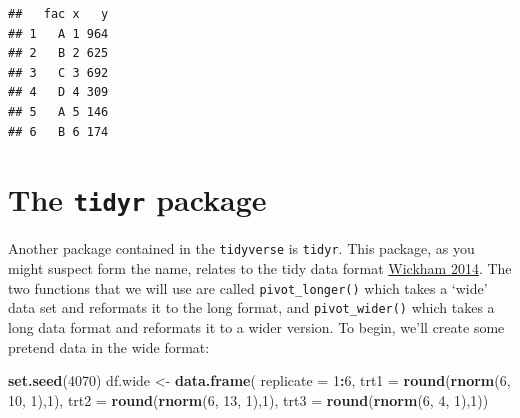 \documentclass[letterpaper,]{book}
\newenvironment{Shaded}{\begin{snugshade}}{\end{snugshade}}
\newcommand{\CommentTok}[1]{\textcolor[rgb]{0.56,0.35,0.01}{\textit{#1}}}
\newcommand{\DataTypeTok}[1]{\textcolor[rgb]{0.13,0.29,0.53}{#1}}
\newcommand{\DecValTok}[1]{\textcolor[rgb]{0.00,0.00,0.81}{#1}}
\newcommand{\KeywordTok}[1]{\textcolor[rgb]{0.13,0.29,0.53}{\textbf{#1}}}
\newcommand{\NormalTok}[1]{#1}
\newcommand{\OperatorTok}[1]{\textcolor[rgb]{0.81,0.36,0.00}{\textbf{#1}}}
\newcommand{\StringTok}[1]{\textcolor[rgb]{0.31,0.60,0.02}{#1}}
\begin{document}
\begin{Shaded}
\end{Shaded}

\begin{verbatim}
##   fac x   y
## 1   A 1 964
## 2   B 2 625
## 3   C 3 692
## 4   D 4 309
## 5   A 5 146
## 6   B 6 174
\end{verbatim}

\hypertarget{the-tidyr-package}{%
\section{\texorpdfstring{The \texttt{tidyr} package}{The tidyr package}}\label{the-tidyr-package}}

Another package contained in the \texttt{tidyverse} is \texttt{tidyr}. This package, as you might suspect form the name, relates to the tidy data format \href{https://vita.had.co.nz/papers/tidy-data.pdf}{Wickham 2014}. The two functions that we will use are called \texttt{pivot\_longer()} which takes a `wide' data set and reformats it to the long format, and \texttt{pivot\_wider()} which takes a long data format and reformats it to a wider version. To begin, we'll create some pretend data in the wide format:

\begin{Shaded}
\begin{Highlighting}[]
\KeywordTok{set.seed}\NormalTok{(}\DecValTok{4070}\NormalTok{)}
\NormalTok{df.wide <-}\StringTok{ }\KeywordTok{data.frame}\NormalTok{(}
  \DataTypeTok{replicate =} \DecValTok{1}\OperatorTok{:}\DecValTok{6}\NormalTok{,}
  \DataTypeTok{trt1 =} \KeywordTok{round}\NormalTok{(}\KeywordTok{rnorm}\NormalTok{(}\DecValTok{6}\NormalTok{, }\DecValTok{10}\NormalTok{, }\DecValTok{1}\NormalTok{),}\DecValTok{1}\NormalTok{),}
  \DataTypeTok{trt2 =} \KeywordTok{round}\NormalTok{(}\KeywordTok{rnorm}\NormalTok{(}\DecValTok{6}\NormalTok{, }\DecValTok{13}\NormalTok{, }\DecValTok{1}\NormalTok{),}\DecValTok{1}\NormalTok{),}
  \DataTypeTok{trt3 =} \KeywordTok{round}\NormalTok{(}\KeywordTok{rnorm}\NormalTok{(}\DecValTok{6}\NormalTok{, }\DecValTok{4}\NormalTok{, }\DecValTok{1}\NormalTok{),}\DecValTok{1}\NormalTok{))}
\end{Highlighting}
\end{Shaded}
\end{document}
